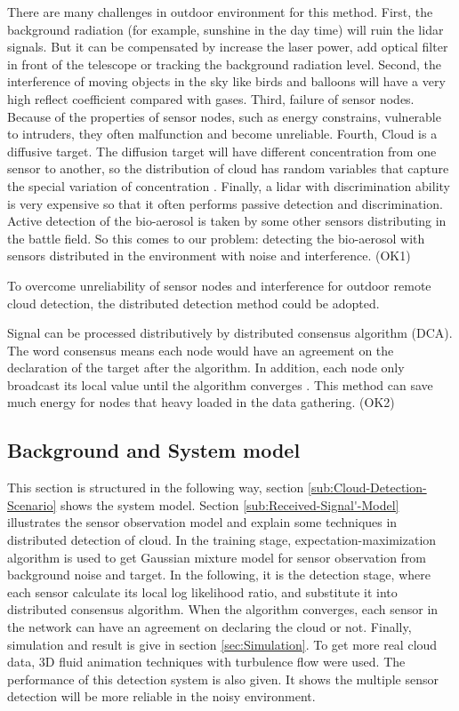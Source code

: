There are many challenges in outdoor environment for this method.
First, the background radiation (for example, sunshine in the day
time) will ruin the lidar signals. But it can be compensated by increase
the laser power, add optical filter in front of the telescope or tracking
the background radiation level. Second, the interference of moving
objects in the sky like birds and balloons will have a very high reflect
coefficient compared with gases. Third, failure of sensor nodes. Because
of the properties of sensor nodes, such as energy constrains, vulnerable
to intruders, they often malfunction and become unreliable. Fourth,
Cloud is a diffusive target. The diffusion target will have different
concentration from one sensor to another, so the distribution of cloud
has random variables that capture the special variation of concentration
\cite{N.Kh.2004}. Finally, a lidar with discrimination ability is
very expensive so that it often performs passive detection and discrimination.
Active detection of the bio-aerosol is taken by some other sensors
distributing in the battle field. So this comes to our problem: detecting
the bio-aerosol with sensors distributed in the environment with noise
and interference. (OK1)

To overcome unreliability of sensor nodes and interference for outdoor
remote cloud detection, the distributed detection method could be
adopted.

Signal can be processed distributively by distributed consensus algorithm
(DCA). The word consensus means each node would have an agreement
on the declaration of the target after the algorithm. In addition,
each node only broadcast its local value until the algorithm converges
\cite{Xiao2004}. This method can save much energy for nodes that
heavy loaded in the data gathering. (OK2)


\subsection{Background and System model }

This section is structured in the following way, section \ref{sub:Cloud-Detection-Scenario}
shows the system model. Section \ref{sub:Received-Signal'-Model}
illustrates the sensor observation model and explain some techniques
in distributed detection of cloud. In the training stage, expectation-maximization
algorithm is used to get Gaussian mixture model for sensor observation
from background noise and target. In the following, it is the detection
stage, where each sensor calculate its local log likelihood ratio,
and substitute it into distributed consensus algorithm. When the algorithm
converges, each sensor in the network can have an agreement on declaring
the cloud or not. Finally, simulation and result is give in section
\ref{sec:Simulation}. To get more real cloud data, 3D fluid animation
techniques with turbulence flow were used. The performance of this
detection system is also given. It shows the multiple sensor detection
will be more reliable in the noisy environment.


